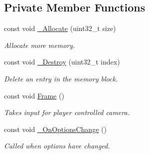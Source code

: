 \subsection*{Private Member Functions}
\begin{DoxyCompactItemize}
\item 
const void \hyperlink{class_ensum_1_1_components_1_1_camera_manager_a1ccb090150e77084806fa903bc5006e5}{\+\_\+\+Allocate} (uint32\+\_\+t size)\hypertarget{class_ensum_1_1_components_1_1_camera_manager_a1ccb090150e77084806fa903bc5006e5}{}\label{class_ensum_1_1_components_1_1_camera_manager_a1ccb090150e77084806fa903bc5006e5}

\begin{DoxyCompactList}\small\item\em Allocate more memory. \end{DoxyCompactList}\item 
const void \hyperlink{class_ensum_1_1_components_1_1_camera_manager_a7a4aff38cf9e0fa2d504e0836d06efe7}{\+\_\+\+Destroy} (uint32\+\_\+t index)
\begin{DoxyCompactList}\small\item\em Delete an entry in the memory block. \end{DoxyCompactList}\item 
const void \hyperlink{class_ensum_1_1_components_1_1_camera_manager_af3d4e192ed57eccef18ae37bbb6377e2}{Frame} ()
\begin{DoxyCompactList}\small\item\em Takes input for player controlled camera. \end{DoxyCompactList}\item 
const void \hyperlink{class_ensum_1_1_components_1_1_camera_manager_a59015c858649a55264cb89f0338d5b96}{\+\_\+\+On\+Options\+Change} ()\hypertarget{class_ensum_1_1_components_1_1_camera_manager_a59015c858649a55264cb89f0338d5b96}{}\label{class_ensum_1_1_components_1_1_camera_manager_a59015c858649a55264cb89f0338d5b96}

\begin{DoxyCompactList}\small\item\em Called when options have changed. \end{DoxyCompactList}\end{DoxyCompactItemize}

